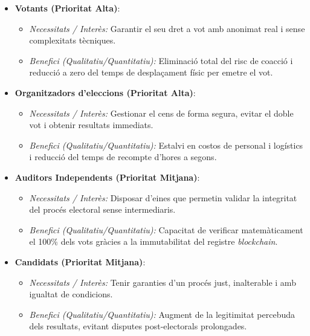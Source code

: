 \documentclass[12pt,a4paper]{article}
\begin{document}
\begin{itemize}[leftmargin=*]
    \item \textbf{Votants (Prioritat Alta)}:
    \begin{itemize}
        \item \textit{Necessitats / Interès:} Garantir el seu dret a vot amb anonimat real  i sense complexitats tècniques.
        \item \textit{Benefici (Qualitatiu/Quantitatiu):} Eliminació total del risc de coacció i reducció a zero del temps de desplaçament físic per emetre el vot.
    \end{itemize}

    \item \textbf{Organitzadors d'eleccions (Prioritat Alta)}:
    \begin{itemize}
        \item \textit{Necessitats / Interès:} Gestionar el cens de forma segura, evitar el doble vot  i obtenir resultats immediats.
        \item \textit{Benefici (Qualitatiu/Quantitatiu):} Estalvi en costos de personal i logístics i reducció del temps de recompte d'hores a segons.
    \end{itemize}

    \item \textbf{Auditors Independents (Prioritat Mitjana)}:
    \begin{itemize}
        \item \textit{Necessitats / Interès:} Disposar d'eines que permetin validar la integritat del procés electoral sense intermediaris.
        \item \textit{Benefici (Qualitatiu/Quantitatiu):} Capacitat de verificar matemàticament el 100\% dels vots gràcies a la immutabilitat del registre \textit{blockchain}.
    \end{itemize}

    \item \textbf{Candidats (Prioritat Mitjana)}:
    \begin{itemize}
        \item \textit{Necessitats / Interès:} Tenir garanties d'un procés just, inalterable i amb igualtat de condicions.
        \item \textit{Benefici (Qualitatiu/Quantitatiu):} Augment de la legitimitat percebuda dels resultats, evitant disputes post-electorals prolongades.
    \end{itemize}
\end{itemize}
\end{document}
